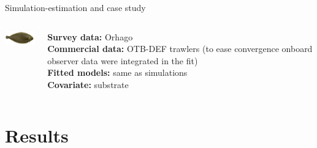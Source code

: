 \documentclass[
  10pt,
  ignorenonframetext,
]{beamer}
\begin{document}
\begin{frame}{Simulation-estimation and case study}
\begin{columns}
\begin{column}{0.5\textwidth}
{\begin{columns}
\begin{column}{0.5\textwidth}
\center
\includegraphics[width=2cm]{images/solea_solea.png}
\vspace{\baselineskip}
\vspace{\baselineskip}
\end{column}
\begin{column}{0.5\textwidth}
\tiny \textcolor{SurveyBlue}{\textbf{Survey data:}} Orhago\\
\textbf{Commercial data:} OTB-DEF trawlers (to ease convergence onboard observer data were integrated in the fit)\\
\textbf{Fitted models:} same as simulations\\
\textcolor{BaptisteOrange}{\textbf{Covariate:}} substrate

\normalsize \vspace{\baselineskip}
 
\end{column}
\end{columns}

}

\end{column}
\end{columns}

\end{frame}

\hypertarget{results}{%
\section{Results}\label{results}}
\end{document}

